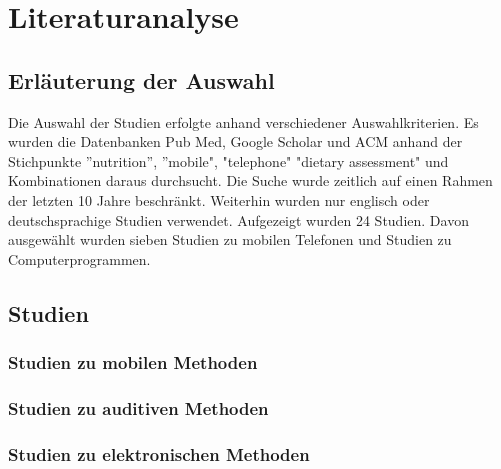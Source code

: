 \section{Literaturanalyse}

\subsection{Erläuterung der Auswahl}

Die Auswahl der Studien erfolgte anhand verschiedener Auswahlkriterien. Es wurden die Datenbanken Pub Med, Google Scholar und ACM anhand der Stichpunkte ''nutrition'', ''mobile", "telephone" "dietary assessment" und Kombinationen daraus durchsucht. Die Suche wurde zeitlich auf einen Rahmen der letzten 10 Jahre beschränkt. Weiterhin wurden nur englisch oder deutschsprachige Studien verwendet. Aufgezeigt wurden 24 Studien. Davon ausgewählt wurden sieben Studien zu mobilen Telefonen und Studien zu Computerprogrammen. 

\subsection{Studien}
\subsubsection{Studien zu mobilen Methoden}
\subsubsection{Studien zu auditiven Methoden}
\subsubsection{Studien zu elektronischen Methoden}




